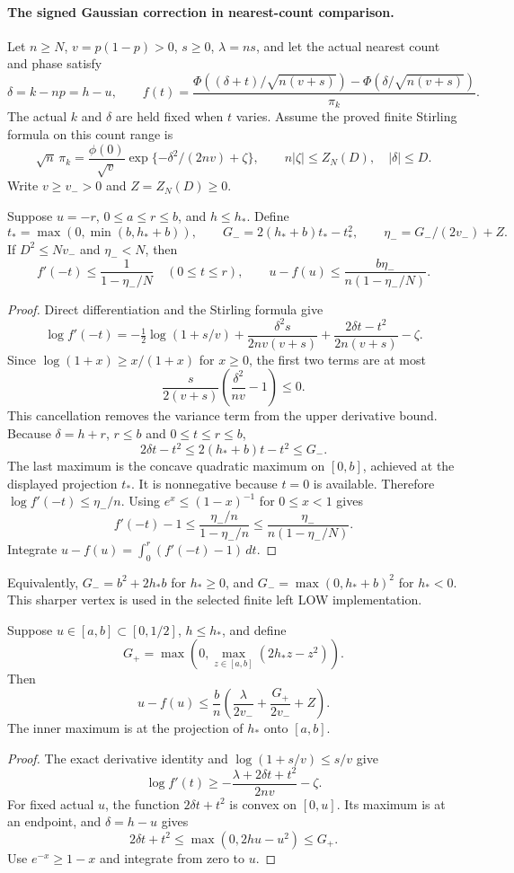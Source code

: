 \paragraph{The signed Gaussian correction in nearest-count comparison.}

Let $n\ge N$, $v=p(1-p)>0$, $s\ge0$, $\lambda=ns$, and let the
actual nearest count and phase satisfy
\[
 \delta=k-np=h-u,\qquad
 f(t)=\frac{\Phi((\delta+t)/\sqrt{n(v+s)})-
                   \Phi(\delta/\sqrt{n(v+s)})}{\pi_k}.
\]
The actual $k$ and $\delta$ are held fixed when $t$ varies. Assume the
proved finite Stirling formula on this count range is
\[
 \sqrt n\,\pi_k=\frac{\phi(0)}{\sqrt v}
       \exp\{-\delta^2/(2nv)+\zeta\},\qquad
 n|\zeta|\le Z_N(D),\quad |\delta|\le D.
\]
Write $v\ge v_->0$ and $Z=Z_N(D)\ge0$.

\begin{lemma}
Suppose $u=-r$, $0\le a\le r\le b$, and $h\le h_*$. Define
\[
 t_*=\max(0,\min(b,h_*+b)),\qquad G_-=2(h_*+b)t_*-t_*^2,\qquad
 \eta_-=G_-/(2v_-)+Z.
\]
If $D^2\le Nv_-$ and $\eta_-<N$, then
\[
 f'(-t)\le\frac1{1-\eta_-/N}\quad(0\le t\le r),\qquad
 u-f(u)\le\frac{b\eta_-}{n(1-\eta_-/N)}.
\]
\end{lemma}
\begin{proof}
Direct differentiation and the Stirling formula give
\[
 \log f'(-t)=-\tfrac12\log(1+s/v)
 +\frac{\delta^2s}{2nv(v+s)}
 +\frac{2\delta t-t^2}{2n(v+s)}-\zeta.
\]
Since $\log(1+x)\ge x/(1+x)$ for $x\ge0$, the first two terms are at most
\[
 \frac{s}{2(v+s)}\left(\frac{\delta^2}{nv}-1\right)\le0.
\]
This cancellation removes the variance term from the upper derivative
bound. Because $\delta=h+r$, $r\le b$ and $0\le t\le r\le b$,
\[
 2\delta t-t^2\le 2(h_*+b)t-t^2\le G_-.
\]
The last maximum is the concave quadratic maximum on $[0,b]$, achieved
at the displayed projection $t_*$. It is nonnegative because $t=0$ is
available. Therefore $\log f'(-t)\le\eta_-/n$.
Using $e^x\le(1-x)^{-1}$ for $0\le x<1$ gives
\[
 f'(-t)-1\le\frac{\eta_-/n}{1-\eta_-/n}
             \le\frac{\eta_-}{n(1-\eta_-/N)}.
\]
Integrate $u-f(u)=\int_0^r(f'(-t)-1)\,dt$.
\end{proof}

Equivalently, $G_-=b^2+2h_*b$ for $h_*\ge0$, and
$G_-=\max(0,h_*+b)^2$ for $h_*<0$. This sharper vertex is used in the
selected finite left LOW implementation.

\begin{lemma}
Suppose $u\in[a,b]\subset[0,1/2]$, $h\le h_*$, and define
\[
 G_+=\max\left(0,\max_{z\in[a,b]}(2h_*z-z^2)\right).
\]
Then
\[
 u-f(u)\le\frac b n
       \left(\frac\lambda{2v_-}+\frac{G_+}{2v_-}+Z\right).
\]
The inner maximum is at the projection of $h_*$ onto $[a,b]$.
\end{lemma}
\begin{proof}
The exact derivative identity and $\log(1+s/v)\le s/v$ give
\[
 \log f'(t)\ge-\frac{\lambda+2\delta t+t^2}{2nv}-\zeta.
\]
For fixed actual $u$, the function $2\delta t+t^2$ is convex on $[0,u]$.
Its maximum is at an endpoint, and $\delta=h-u$ gives
\[
 2\delta t+t^2\le\max(0,2hu-u^2)\le G_+.
\]
Use $e^{-x}\ge1-x$ and integrate from zero to $u$.
\end{proof}

